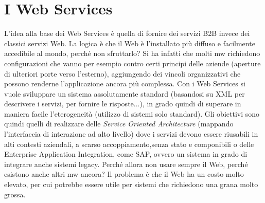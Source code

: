 \chapter{I Web Services}
L'idea alla base dei Web Services è quella di fornire dei servizi B2B invece dei classici servizi Web. La logica è che
il Web è l'installato più diffuso e facilmente accedibile al mondo, perché non sfruttarlo?
Si ha infatti che molti mw richiedono configurazioni che vanno per esempio contro certi principi delle aziende
(aperture di ulteriori porte verso l'esterno), aggiungendo dei vincoli organizzativi che possono renderne
l'applicazione ancora più complessa.
Con i Web Services si vuole sviluppare un sistema assolutamente standard (basandosi su XML per descrivere i servizi,
per fornire le risposte...), in grado quindi di superare in maniera facile l'eterogeneità (utilizzo di sistemi solo
standard). Gli obiettivi sono quindi quelli di realizzare delle \textit{Service Oriented Architecture} (mappando
l'interfaccia di interazione ad alto livello) dove i servizi devono essere
riusabili in alti contesti aziendali, a scarso accoppiamento,senza stato e
componibili o delle Enterprise Application Integration, come SAP, ovvero un
sistema in grado di integrare anche sistemi legacy.
Perché allora non usare sempre il Web, perché esistono anche altri mw ancora?
Il problema è che il Web ha un costo molto elevato, per cui potrebbe essere
utile per sistemi che richiedono una grana molto grossa.
